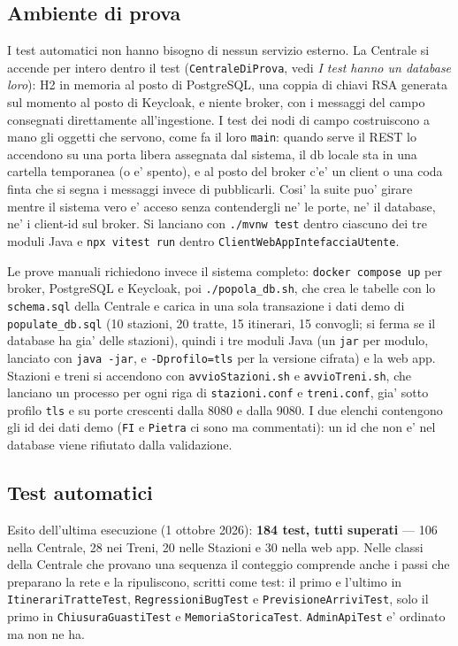 \documentclass[11pt]{article}
\begin{document}
\subsection{Ambiente di prova}
\label{sec:org7c10499}

I test automatici non hanno bisogno di nessun servizio esterno. La Centrale si accende per intero
dentro il test (\texttt{CentraleDiProva}, vedi \emph{I test hanno un database loro}): H2 in memoria al posto di
PostgreSQL, una coppia di chiavi RSA generata sul momento al posto di Keycloak, e niente broker, con i
messaggi del campo consegnati direttamente all'ingestione. I test dei nodi di campo costruiscono a
mano gli oggetti che servono, come fa il loro \texttt{main}: quando serve il REST lo accendono su una porta
libera assegnata dal sistema, il db locale sta in una cartella temporanea (o e' spento), e al posto
del broker c'e' un client o una coda finta che si segna i messaggi invece di pubblicarli. Cosi' la
suite puo' girare mentre il sistema vero e' acceso senza contendergli ne' le porte, ne' il database,
ne' i client-id sul broker. Si lanciano con \texttt{./mvnw test} dentro ciascuno dei tre moduli Java e
\texttt{npx vitest run} dentro \texttt{ClientWebAppIntefacciaUtente}.

Le prove manuali richiedono invece il sistema completo: \texttt{docker compose up} per broker, PostgreSQL e
Keycloak, poi \texttt{./popola\_db.sh}, che crea le tabelle con lo \texttt{schema.sql} della Centrale e carica in
una sola transazione i dati demo di \texttt{populate\_db.sql} (10 stazioni, 20 tratte, 15 itinerari, 15
convogli; si ferma se il database ha gia' delle stazioni), quindi i tre moduli Java (un \texttt{jar} per
modulo, lanciato con \texttt{java -jar}, e \texttt{-Dprofilo=tls} per la versione cifrata) e la web app. Stazioni
e treni si accendono con \texttt{avvioStazioni.sh} e \texttt{avvioTreni.sh}, che lanciano un processo per ogni
riga di \texttt{stazioni.conf} e \texttt{treni.conf}, gia' sotto profilo \texttt{tls} e su porte crescenti dalla 8080 e
dalla 9080. I due elenchi contengono gli id dei dati demo (\texttt{FI} e \texttt{Pietra} ci sono ma commentati): un
id che non e' nel database viene rifiutato dalla validazione.
\subsection{Test automatici}
\label{sec:org6681e88}

Esito dell'ultima esecuzione (1 ottobre 2026): \textbf{184 test, tutti superati} — 106 nella Centrale, 28
nei Treni, 20 nelle Stazioni e 30 nella web app. Nelle classi della Centrale che provano una
sequenza il conteggio comprende anche i passi che preparano la rete e la ripuliscono, scritti come
test: il primo e l'ultimo in \texttt{ItinerariTratteTest}, \texttt{RegressioniBugTest} e \texttt{PrevisioneArriviTest},
solo il primo in \texttt{ChiusuraGuastiTest} e \texttt{MemoriaStoricaTest}. \texttt{AdminApiTest} e' ordinato ma non ne
ha.
\end{document}
